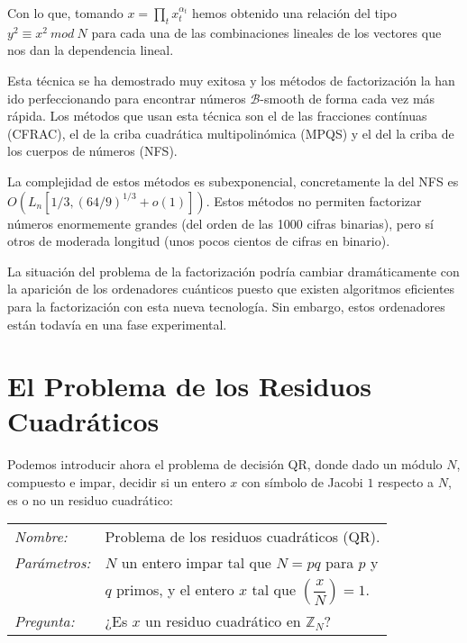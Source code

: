 Con lo que, tomando $x = \prod_t x_t^{\alpha_t}$ hemos obtenido una relaci\'on del tipo $y^2 \equiv x^2~mod~N$ para cada una de las combinaciones lineales de los
vectores que nos dan la dependencia lineal.

Esta t\'ecnica se ha demostrado muy exitosa y los m\'etodos de factorizaci\'on la han ido perfeccionando para encontrar n\'umeros ${\mathcal B}$-smooth de forma cada
vez m\'as r\'apida. Los m\'etodos que usan esta t\'ecnica son el de las fracciones cont\'inuas (CFRAC), el de la criba cuadr\'atica multipolin\'omica (MPQS) y el del
la criba de los cuerpos de n\'umeros (NFS).

La complejidad de estos m\'etodos es subexponencial, concretamente la del NFS es $O(L_n[1/3,(64/9)^{1/3} + o(1)])$. Estos m\'etodos no permiten factorizar n\'umeros
enormemente grandes (del orden de las 1000 cifras binarias), pero s\'i otros de moderada longitud (unos pocos cientos de cifras en binario).

La situaci\'on del problema de la factorizaci\'on podr\'ia cambiar dram\'aticamente con la aparici\'on de los ordenadores cu\'anticos puesto que existen algoritmos
eficientes para la factorizaci\'on con esta nueva tecnolog\'ia. Sin embargo, estos ordenadores est\'an todav\'ia en una fase experimental.


\section{El Problema de los Residuos Cuadr\'aticos}

Podemos introducir ahora  el problema de decisión QR, donde dado un módulo $N$,
compuesto e impar, decidir si un entero $x$ con símbolo de Jacobi $1$ respecto
a $N$, es o no un residuo cuadrático:

\hfil

\begin{tabular}{|ll}\label{problemaQR}
	\textit{Nombre:} & Problema de los residuos cuadr\'aticos (QR). \\
	\textit{Parámetros:} & $N$ un entero impar tal que $N = pq$ para $p$ y \\
	& $q$ primos, y el entero $x$ tal que $\left( \dfrac{x}{N} \right) = 1$. \\
	\textit{Pregunta:} & ¿Es $x$ un residuo cuadrático en ${\mathbb Z}_N$? \\
\end{tabular}
\\

\hfil

